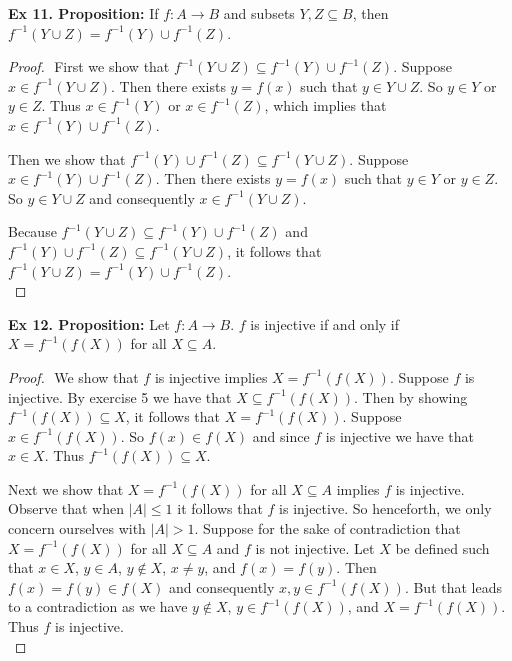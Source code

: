 \documentclass{article}
\begin{document}
\textbf{Ex 11. Proposition:} If $f: A \rightarrow B$ and subsets $Y, Z \subseteq B$, then $f^{-1}(Y \cup Z)=f^{-1}(Y) \cup f^{-1}(Z)$.
\begin{proof}
$ $\newline
First we show that $f^{-1}(Y \cup Z) \subseteq f^{-1}(Y) \cup f^{-1}(Z)$. Suppose $x \in f^{-1}(Y \cup Z)$.
Then there exists $y=f(x)$ such that $y \in Y \cup Z$. So $y \in Y$ or $y \in Z$. Thus $x \in f^{-1}(Y)$ or $x \in f^{-1}(Z)$, which implies that $x \in f^{-1}(Y) \cup f^{-1}(Z)$.

Then we show that $f^{-1}(Y) \cup f^{-1}(Z) \subseteq f^{-1}(Y \cup Z)$. Suppose $x \in f^{-1}(Y) \cup f^{-1}(Z)$. Then there exists $y=f(x)$ such that $y \in Y$ or $y \in Z$. So $y \in Y \cup Z$ and consequently $x \in f^{-1}(Y \cup Z)$.

Because $f^{-1}(Y \cup Z) \subseteq f^{-1}(Y) \cup f^{-1}(Z)$ and $f^{-1}(Y) \cup f^{-1}(Z) \subseteq f^{-1}(Y \cup Z)$, it follows that $f^{-1}(Y \cup Z)=f^{-1}(Y) \cup f^{-1}(Z)$.\\
\end{proof}

\newpage

\textbf{Ex 12. Proposition:} Let $f: A \rightarrow B$. $f$ is injective if and only if $X=f^{-1}(f(X))$ for all $X \subseteq A$.
\begin{proof}
$ $\newline
We show that $f$ is injective implies $X=f^{-1}(f(X))$. Suppose $f$ is injective. By exercise 5 we have that $X \subseteq f^{-1}(f(X))$. Then by showing $f^{-1}(f(X)) \subseteq X$, it follows that $X=f^{-1}(f(X))$. Suppose $x \in f^{-1}(f(X))$. So $f(x) \in f(X)$ and since $f$ is injective we have that $x \in X$. Thus $f^{-1}(f(X)) \subseteq X$.

Next we show that $X=f^{-1}(f(X))$ for all $X \subseteq A$ implies $f$ is injective. Observe that when $|A| \leq 1$ it follows that $f$ is injective. So henceforth, we only concern ourselves with $|A| > 1$. Suppose for the sake of contradiction that $X=f^{-1}(f(X))$ for all $X \subseteq A$ and $f$ is not injective. Let $X$ be defined such that $x \in X$, $y \in A$, $y \not\in X$, $x \neq y$, and $f(x)=f(y)$. Then $f(x) = f(y) \in f(X)$ and consequently $x,y \in f^{-1}(f(X))$. But that leads to a contradiction as we have $y \not\in X$, $y \in f^{-1}(f(X))$, and $X=f^{-1}(f(X))$. Thus $f$ is injective.\\
\end{proof}
\end{document}
